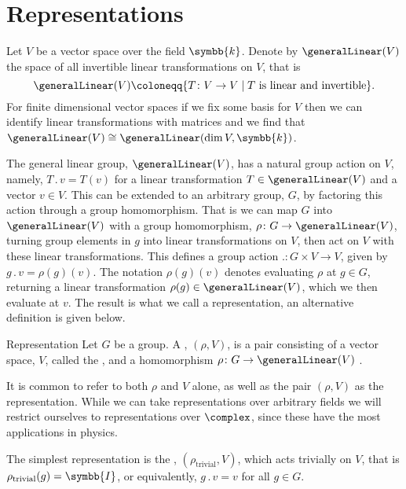 \documentclass[fleqn]{NotesClass}
\newcommand{\identityMatrix}{\symbb{I}}
\renewcommand{\field}{\symbb{k}}
\newcommand{\action}{\mathbin{.}}
\newcommand{\isomorphic}{\cong}
\begin{document}
    \section{Representations}
    Let \(V\) be a vector space over the field \(\field\).
    Denote by \(\generalLinear(V)\) the space of all invertible linear transformations on \(V\), that is
    \begin{equation}
        \generalLinear(V) \coloneqq \{T \colon V \to V \mid T \text{ is linear and invertible}\}.
    \end{equation}
    For finite dimensional vector spaces if we fix some basis for \(V\) then we can identify linear transformations with matrices and we find that \(\generalLinear(V) \isomorphic \generalLinear(\dim V, \field)\).
    
    The general linear group, \(\generalLinear(V)\), has a natural group action on \(V\), namely, \(T \action v = T(v)\) for a linear transformation \(T \in \generalLinear(V)\) and a vector \(v \in V\).
    This can be extended to an arbitrary group, \(G\), by factoring this action through a group homomorphism.
    That is we can map \(G\) into \(\generalLinear(V)\) with a group homomorphism, \(\rho \colon G \to \generalLinear(V)\), turning group elements in \(g\) into linear transformations on \(V\), then act on \(V\) with these linear transformations.
    This defines a group action \(\action \colon G \times V \to V\), given by \(g \action v = \rho(g)(v)\).
    The notation \(\rho(g)(v)\) denotes evaluating \(\rho\) at \(g \in G\), returning a linear transformation \(\rho(g) \in \generalLinear(V)\), which we then evaluate at \(v\).
    The result is what we call a representation, an alternative definition is given below.
    
    \begin{dfn}{Representation}{}
        Let \(G\) be a group.
        A , \((\rho, V)\), is a pair consisting of a vector space, \(V\), called the , and a homomorphism \(\rho \colon G \to \generalLinear(V)\) \cite[726]{hassani}.
    \end{dfn}
    
    It is common to refer to both \(\rho\) and \(V\) alone, as well as the pair \((\rho, V)\) as the representation.
    While we can take representations over arbitrary fields we will restrict ourselves to representations over \(\complex\), since these have the most applications in physics.
    
    The simplest representation is the , \((\rho_{\text{trivial}}, V)\), which acts trivially on \(V\), that is \(\rho_{\text{trivial}}(g) = \identityMatrix\), or equivalently, \(g \action v = v\) for all \(g \in G\).
    
\end{document}
